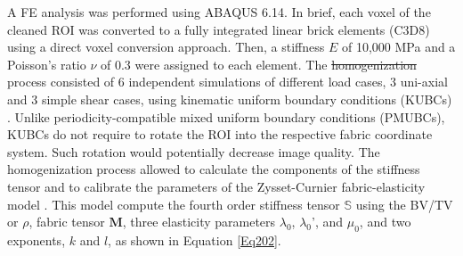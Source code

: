 \documentclass[a4paper,fleqn]{DC_ArtStyle}
\providecommand{\DIFadd}[1]{{\protect\color{blue}{#1}}} %
\providecommand{\DIFdel}[1]{{\protect\color{red}\sout{#1}}}                      %
\providecommand{\DIFaddbegin}{} %
\providecommand{\DIFaddend}{} %
\providecommand{\DIFdelbegin}{} %
\providecommand{\DIFdelend}{} %
\begin{document}
A \si{\micro}FE analysis was performed using \textsc{ABAQUS 6.14}. In brief, each voxel of the cleaned ROI was converted to a fully integrated linear brick elements (C3D8) using a direct voxel conversion approach. Then, a stiffness $E$ of 10,000 MPa and a Poisson's ratio $\nu$ of 0.3 were assigned to each element. The \DIFdelbegin \DIFdel{homogenization }\DIFdelend \DIFaddbegin \DIFadd{homogenisation }\DIFaddend process consisted of 6 independent simulations of different load cases, 3 uni-axial and 3 simple shear cases, using kinematic uniform boundary conditions (KUBCs) \cite{Panyasantisuk2015}. Unlike periodicity-compatible mixed uniform boundary conditions (PMUBCs), KUBCs do not require to rotate the ROI into the respective fabric coordinate system. Such rotation would potentially decrease image quality. The homogenization process allowed to calculate the components of the stiffness tensor and to calibrate the parameters of the Zysset-Curnier fabric-elasticity model \cite{Zysset1995}. This model compute the fourth order stiffness tensor $\mathbb{S}$ using the BV/TV or $\rho$, fabric tensor $\mathbf{M}$, three elasticity parameters $\lambda_0$, $\lambda_0$', and $\mu_0$, and two exponents, $k$ and $l$, as shown in Equation \ref{Eq202}.\\
\end{document}
